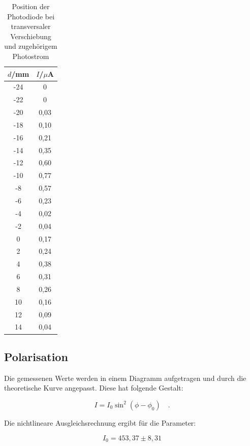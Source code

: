 \begin{table}[H]
	\begin{center}
		\begin{tabular}{c c}
			\toprule
			\(d\)/mm & \(I\)/\(\mu\)A \\
			\midrule
			-24     &0\\
			-22     &0\\
			-20     &0,03\\
			-18     &0,10\\
			-16     &0,21\\
			-14     &0,35\\
			-12     &0,60\\
			-10     &0,77\\
			-8      &0,57\\
			-6      &0,23\\
			-4      &0,02\\
			-2      &0,04\\
			0       &0,17\\
			2       &0,24\\
			4       &0,38\\
			6       &0,31\\
			8       &0,26\\
			10     & 0,16\\
			12      &0,09\\
			14      &0,04\\
			\bottomrule
		\end{tabular}
		\caption{Position der Photodiode bei transversaler Verschiebung und zugehörigem Photostrom}
		\label{tab:t6}
	\end{center}
\end{table}

\subsection{Polarisation}
Die gemessenen Werte werden in einem Diagramm aufgetragen und durch die theoretische Kurve angepasst. Diese hat folgende Gestalt:

\begin{equation}
I=I_0\sin^2{(\phi-\phi_0)}\quad.
\end{equation}

\noindent Die nichtlineare Ausgleichsrechnung ergibt für die Parameter:

\begin{equation*}
I_0=453,37\pm8,31
\end{equation*}

